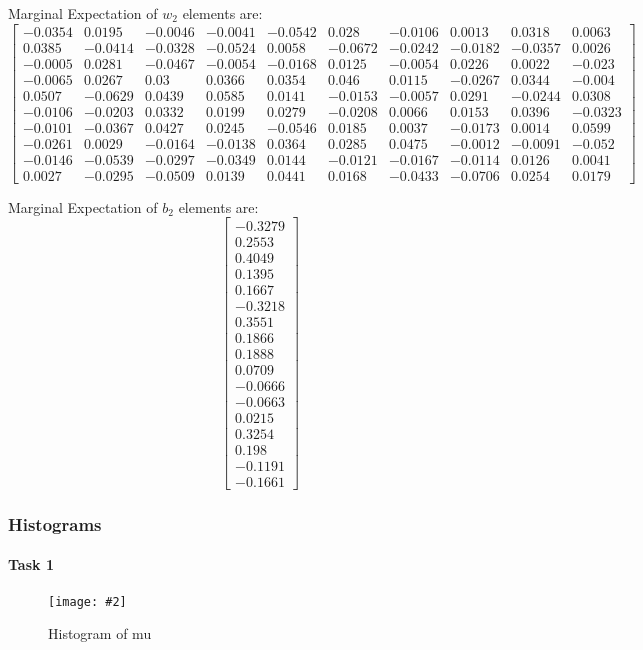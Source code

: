 \documentclass{article}
\newcommand{\centerfigcap}[3]{\begin{figure}[H]
\begin{center}\texttt{[image: \#2]} \caption{#3}\end{center}
\end{figure}}
\begin{document}
Marginal Expectation of $w_2$ elements are:
\[
\begin{bmatrix}
-0.0354 &
0.0195&
-0.0046&
-0.0041&
-0.0542&
0.028&
-0.0106&
0.0013&
0.0318&
0.0063\\
0.0385&
-0.0414&
-0.0328&
-0.0524&
0.0058&
-0.0672&
-0.0242&
-0.0182&
-0.0357&
0.0026\\
-0.0005&
0.0281&
-0.0467&
-0.0054&
-0.0168&
0.0125&
-0.0054&
0.0226&
0.0022&
-0.023\\
-0.0065&
0.0267&
0.03&
0.0366&
0.0354&
0.046&
0.0115&
-0.0267&
0.0344&
-0.004\\
0.0507&
-0.0629&
0.0439&
0.0585&
0.0141&
-0.0153&
-0.0057&
0.0291&
-0.0244&
0.0308\\
-0.0106&
-0.0203&
0.0332&
0.0199&
0.0279&
-0.0208&
0.0066&
0.0153&
0.0396&
-0.0323\\
-0.0101&
-0.0367&
0.0427&
0.0245&
-0.0546&
0.0185&
0.0037&
-0.0173&
0.0014&
0.0599\\
-0.0261&
0.0029&
-0.0164&
-0.0138&
0.0364&
0.0285&
0.0475&
-0.0012&
-0.0091&
-0.052\\
-0.0146&
-0.0539&
-0.0297&
-0.0349&
0.0144&
-0.0121&
-0.0167&
-0.0114&
0.0126&
0.0041\\
0.0027&
-0.0295&
-0.0509&
0.0139&
0.0441&
0.0168&
-0.0433&
-0.0706&
0.0254&
0.0179

\end{bmatrix}
\]

Marginal Expectation of $b_2$ elements are:
\[
\begin{bmatrix}
-0.3279\\
0.2553\\
0.4049\\
0.1395\\
0.1667\\
-0.3218\\
0.3551\\
0.1866\\
0.1888\\
0.0709\\
-0.0666\\
-0.0663\\
0.0215\\
0.3254\\
0.198\\
-0.1191\\
-0.1661
\end{bmatrix}
\]
\subsubsection{Histograms}
\paragraph{Task 1}
\centerfigcap{0.6}{../Results/eval_1}{Histogram of mu}
\end{document}
